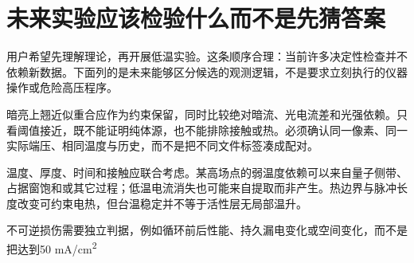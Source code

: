 \section{{\cjkfont 未来实验应该检验什么而不是先猜答案}\allowbreak{}}\label{sec:57}
{\cjkfont 用户希望先理解理论，再开展低温实验。这条顺序合理：当前许多决定性检查并不依赖新数据。下面列的是未来能够区分候选的观测逻辑，不是要求立刻执行的仪器操作或危险高压程序。}\allowbreak{}
\par
{\cjkfont 暗亮上翘近似重合应作为约束保留，同时比较绝对暗流、光电流差和光强依赖。只看阈值接近，既不能证明纯体源，也不能排除接触或热。必须确认同一像素、同一实际端压、相同温度与历史，而不是把不同文件标签凑成配对。}\allowbreak{}
\par
{\cjkfont 温度、厚度、时间和接触应联合考虑。某高场点的弱温度依赖可以来自量子侧带、占据窗饱和或其它过程；低温电流消失也可能来自提取而非产生。热边界与脉冲长度改变可约束电热，但台温稳定并不等于活性层无局部温升。}\allowbreak{}
\par
{\cjkfont 不可逆损伤需要独立判据，例如循环前后性能、持久漏电变化或空间变化，而不是把达到}\allowbreak{}50 mA/cm\textsuperscript{2}\allowbreak{}
\par
